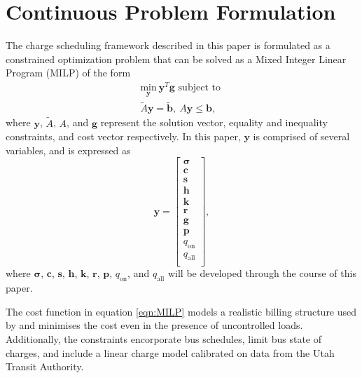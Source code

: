\section{Continuous Problem Formulation\label{sec:4_formulation}}
The charge scheduling framework described in this paper is formulated as a constrained optimization problem that can be solved as a Mixed Integer Linear Program (MILP) of the form
\begin{equation}\label{eqn:MILP}\begin{matrix}
	\underset{\mathbf{y}}{\text{min}} \ \mathbf{y}^T\mathbf{g} \text{ subject to } \\
	\tilde{A}\mathbf{y} = \tilde{\mathbf{b}}, \ A\mathbf{y} \le \mathbf{b},
\end{matrix} \end{equation}
where $\mathbf{y}$, $\tilde{A}$, $A$, and $\mathbf{g}$ represent the solution vector, equality and inequality constraints, and cost vector respectively. In this paper, $\mathbf{y}$ is comprised of several variables, and is expressed as 
\begin{equation}
	\mathbf{y} = \begin{bmatrix}
			\mathbf{\sigma} \\ 
			\mathbf{c}      \\ 
			\mathbf{s}      \\ 
			\mathbf{h}      \\ 
			\mathbf{k}      \\ 
			\mathbf{r}      \\ 
			\mathbf{g}      \\
			\mathbf{p}      \\ 
			q_{\text{on}}   \\ 
			q_{\text{all}}  \\
		     \end{bmatrix},
\end{equation}
where $\mathbf{\sigma}$, $\mathbf{c}$, $\mathbf{s}$, $\mathbf{h}$, $\mathbf{k}$, $\mathbf{r}$, $\mathbf{p}$, $q_{\text{on}}$, and $q_{\text{all}}$ will be developed through the course of this paper.
\par The cost function in equation \ref{eqn:MILP} models a realistic billing structure used by \cite{rocky_mountain_power_rocky_2021} and minimises the cost even in the presence of uncontrolled loads. Additionally, the constraints encorporate bus schedules, limit bus state of charges, and include a linear charge model calibrated on data from the Utah Transit Authority.
